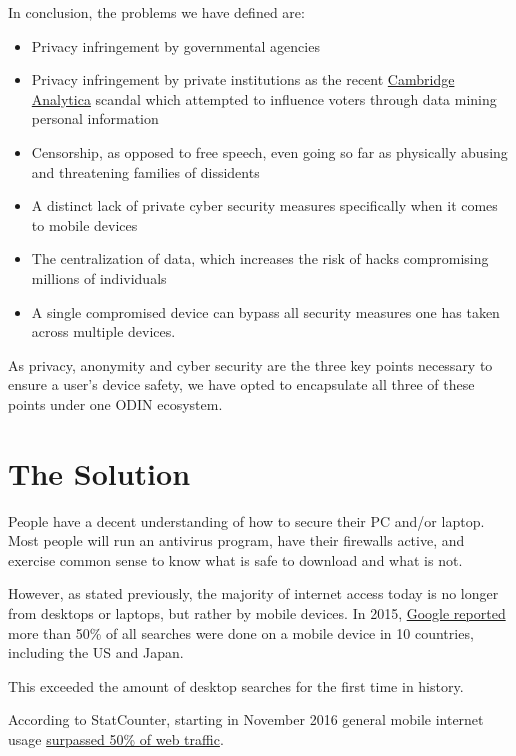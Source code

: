\documentclass[12pt,letterpaper]{article}
\begin{document}
In conclusion, the problems we have defined are:
\begin{itemize}
   \item Privacy infringement by governmental agencies
   \item Privacy infringement by private institutions as the recent \href{https://www.bbc.com/news/technology-43465968}{Cambridge Analytica} scandal which attempted to influence voters through data mining personal information
   \item Censorship, as opposed to free speech, even going so far as physically abusing and threatening families of dissidents
   \item A distinct lack of private cyber security measures specifically when it comes to mobile devices
   \item The centralization of data, which increases the risk of hacks compromising millions of individuals
   \item A single compromised device can bypass all security measures one has taken across multiple devices.
\end{itemize}
As privacy, anonymity and cyber security are the three key points necessary to ensure a user's device safety, we have opted to encapsulate all three of these points under one ODIN ecosystem. 

\newpage
\section{The Solution}\hypertarget{solution}{}

People have a decent understanding of how to secure their PC and/or laptop. Most people will run an antivirus program, have their firewalls active, and exercise common sense to know what is safe to download and what is not. 

However, as stated previously, the majority of internet access today is no longer from desktops or laptops, but rather by mobile devices.  In 2015, \href{https://adwords.googleblog.com/2015/05/building-for-next-moment.html}{Google reported} more than 50\% of all searches were done on a mobile device in 10 countries, including the US and Japan. 

This exceeded the amount of desktop searches for the first time in history.

According to StatCounter, starting in November 2016 general mobile internet usage \href{http://gs.statcounter.com/#mobile_vs_desktop-ww-monthly-201611-201611-bar}{surpassed 50\% of web traffic}.
\end{document}
